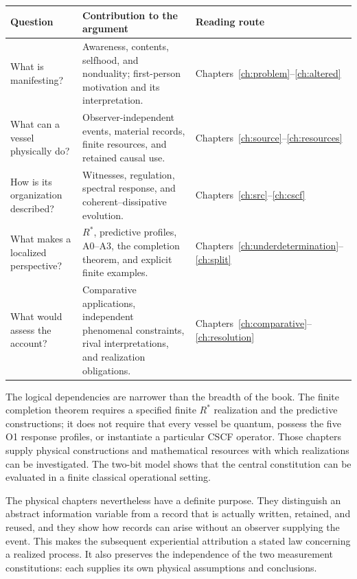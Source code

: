 \begin{center}\small
\begin{tabularx}{\textwidth}{@{}p{}Yp{.21\textwidth}@{}}\toprule
Question & Contribution to the argument & Reading route\\\midrule
What is manifesting? & Awareness, contents, selfhood, and nonduality; first-person motivation and its interpretation. & Chapters~\ref{ch:problem}--\ref{ch:altered}\\
What can a vessel physically do? & Observer-independent events, material records, finite resources, and retained causal use. & Chapters~\ref{ch:source}--\ref{ch:resources}\\
How is its organization described? & Witnesses, regulation, spectral response, and coherent--dissipative evolution. & Chapters~\ref{ch:src}--\ref{ch:cscf}\\
What makes a localized perspective? & $R^\ast$, predictive profiles, A0--A3, the completion theorem, and explicit finite examples. & Chapters~\ref{ch:underdetermination}--\ref{ch:split}\\
What would assess the account? & Comparative applications, independent phenomenal constraints, rival interpretations, and realization obligations. & Chapters~\ref{ch:comparative}--\ref{ch:resolution}\\\bottomrule
\end{tabularx}
\end{center}

The logical dependencies are narrower than the breadth of the book. The finite completion theorem requires a specified finite $R^\ast$ realization and the predictive constructions; it does not require that every vessel be quantum, possess the five O1 response profiles, or instantiate a particular CSCF operator. Those chapters supply physical constructions and mathematical resources with which realizations can be investigated. The two-bit model shows that the central constitution can be evaluated in a finite classical operational setting.

The physical chapters nevertheless have a definite purpose. They distinguish an abstract information variable from a record that is actually written, retained, and reused, and they show how records can arise without an observer supplying the event. This makes the subsequent experiential attribution a stated law concerning a realized process. It also preserves the independence of the two measurement constitutions: each supplies its own physical assumptions and conclusions.
\tableofcontents
\mainmatter


